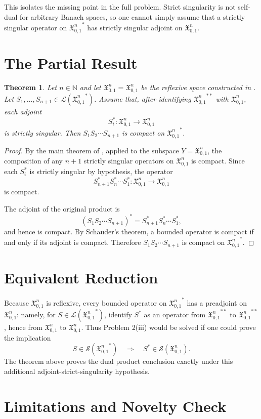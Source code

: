 \documentclass[11pt]{article}
\newtheorem{theorem}{Theorem}
\newcommand{\X}{\mathfrak{X}_{0,1}^{n}}
\newcommand{\SSing}{\mathcal{S}}
\begin{document}
This isolates the missing point in the full problem.  Strict singularity is
not self-dual for arbitrary Banach spaces, so one cannot simply assume that a
strictly singular operator on ${\X}^*$ has strictly singular adjoint on $\X$.

\section*{The Partial Result}

\begin{theorem}
Let $n\in\mathbb N$ and let $\X=\mathfrak X_{0,1}^n$ be the reflexive space
constructed in \cite{ABM}.  Let
$S_1,\ldots,S_{n+1}\in\mathcal L({\X}^*)$.  Assume that, after identifying
${\X}^{**}$ with $\X$, each adjoint
\[
   S_i^*:\X\longrightarrow \X
\]
is strictly singular.  Then $S_1S_2\cdots S_{n+1}$ is compact on ${\X}^*$.
\end{theorem}

\begin{proof}
By the main theorem of \cite{ABM}, applied to the subspace $Y=\X$, the
composition of any $n+1$ strictly singular operators on $\X$ is compact.
Since each $S_i^*$ is strictly singular by hypothesis, the operator
\[
   S_{n+1}^*S_n^*\cdots S_1^*:\X\longrightarrow \X
\]
is compact.

The adjoint of the original product is
\[
   (S_1S_2\cdots S_{n+1})^*
      = S_{n+1}^*S_n^*\cdots S_1^*,
\]
and hence is compact.  By Schauder's theorem, a bounded operator is compact
if and only if its adjoint is compact.  Therefore
$S_1S_2\cdots S_{n+1}$ is compact on ${\X}^*$.
\end{proof}

\section*{Equivalent Reduction}

Because $\X$ is reflexive, every bounded operator on ${\X}^*$ has a preadjoint
on $\X$: namely, for $S\in\mathcal L({\X}^*)$, identify $S^*$ as an operator
from ${\X}^{**}$ to ${\X}^{**}$, hence from $\X$ to $\X$.  Thus Problem 2(iii)
would be solved if one could prove the implication
\[
   S\in\SSing({\X}^*) \quad\Longrightarrow\quad S^*\in\SSing(\X).
\]
The theorem above proves the dual product conclusion exactly under this
additional adjoint-strict-singularity hypothesis.

\section*{Limitations and Novelty Check}
\end{document}

